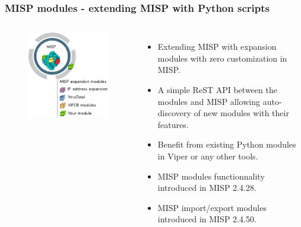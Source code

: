 \begin{frame}
        \frametitle{MISP modules - extending MISP with Python scripts}
        \begin{columns}[t]
        \column{5.6cm}
        \begin{figure}
        \includegraphics[scale=0.70]{misp-expansion.pdf}
        \end{figure}
        \column{6.4cm}
        \begin{itemize}
                \item Extending MISP with expansion modules with zero customization in MISP.
                \item A simple ReST API between the modules and MISP allowing auto-discovery of new modules with their features.
                \item Benefit from existing Python modules in Viper or any other tools.
                \item MISP modules functionnality introduced in MISP 2.4.28.
                \item MISP import/export modules introduced in MISP 2.4.50.
        \end{itemize}
         \end{columns}
\end{frame}

